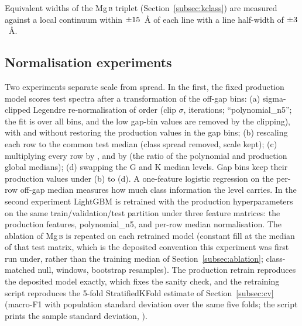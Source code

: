 \documentclass[11pt,a4paper]{article}
\newcommand{\Mgb}{Mg\,\textsc{b}\xspace}
\newcommand{\FeI}{Fe\,\textsc{i}\xspace}
\newcommand{\FeCr}{Fe\,\textsc{i}/Cr\,\textsc{i}\xspace}
\newcommand{\fittable}[1]{\resizebox{\ifdim\width>\linewidth\linewidth\else\width\fi}{!}{#1}}
\begin{document}
Equivalent widths of the \Mgb triplet (Section~\ref{subsec:kclass}) are measured against a local continuum within $\pm15$~\AA{} of each line with a line half-width of $\pm3$~\AA.

\begin{table}[ht]
\centering
\caption{Line sets used in the ablation: air wavelength windows, total mask width, number of feature bins covered, and the other catalogued lines inside each window (other species and same-species lines that are not targets). The \Mgb window also holds \FeI lines, and the two Balmer windows hold the metal lines listed in the last column, so a dependence on a window is a dependence on everything inside it; ``\Mgb dependence'' means dependence on that 21~\AA{} region. The \FeCr set was defined after the SHAP analysis and is post hoc. Bin widths vary with wavelength because the grid is log-uniform.}
\label{tab:linesets}
\footnotesize
\setlength{\tabcolsep}{3pt}
\fittable{}
\end{table}

\subsection{Normalisation experiments}
\label{subsec:norm-methods}

Two experiments separate scale from spread. In the first, the fixed production model scores test spectra after a transformation of the off-gap bins: (a) sigma-clipped Legendre re-normalisation of order \sdPolyOrder{} (clip \sdClipSigma$\sigma$, \sdClipIters{} iterations; ``polynomial\_n5''; the fit is over all bins, and the low gap-bin values are removed by the clipping), with and without restoring the production values in the gap bins; (b) rescaling each row to the common test median (class spread removed, scale kept); (c) multiplying every row by \sdUniMult{}, and by \sdBestMult{} (the ratio of the polynomial and production global medians); (d) swapping the G and K median levels. Gap bins keep their production values under (b) to (d). A one-feature logistic regression on the per-row off-gap median measures how much class information the level carries. In the second experiment LightGBM is retrained with the production hyperparameters on the same train/validation/test partition under three feature matrices: the production features, polynomial\_n5, and per-row median normalisation. The ablation of \Mgb is repeated on each retrained model (constant fill at the median of that test matrix, which is the deposited convention this experiment was first run under, rather than the training median of Section~\ref{subsec:ablation}; class-matched null, \rtNControls{} windows, \rtNBoot{} bootstrap resamples). The production retrain reproduces the deposited model exactly, which fixes the sanity check, and the retraining script reproduces the 5-fold StratifiedKFold estimate of Section~\ref{subsec:cv} (macro-F1 \rtCvMean{} with population standard deviation \cvSd{} over the same five folds; the script prints the sample standard deviation, \rtCvSd).
\end{document}
